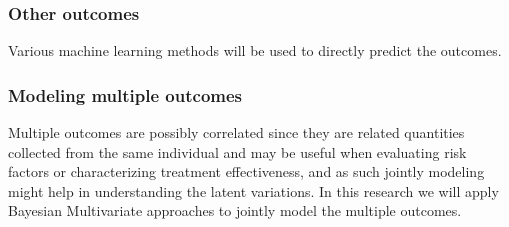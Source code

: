 \subsubsection{Other outcomes}
Various machine learning methods will be used to directly predict the outcomes.

\subsubsection{Modeling multiple outcomes}

Multiple outcomes are possibly correlated since they are related quantities collected from the same individual and may be useful when evaluating risk factors or characterizing treatment effectiveness, and as such jointly modeling might help in understanding the latent variations. In this research we will apply Bayesian Multivariate approaches to jointly model the multiple outcomes.


%




